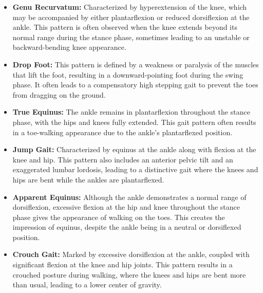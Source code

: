 \documentclass[UKenglish]{uiomasterthesis}
\begin{document}
\begin{itemize}
    \item{\textbf{Genu Recurvatum:} Characterized by hyperextension of the knee, which may be accompanied by either plantarflexion or reduced dorsiflexion at the ankle. This pattern is often observed when the knee extends beyond its normal range during the stance phase, sometimes leading to an unstable or backward-bending knee appearance.}
    
    \item{\textbf{Drop Foot:} This pattern is defined by a weakness or paralysis of the muscles that lift the foot, resulting in a downward-pointing foot during the swing phase. It often leads to a compensatory high stepping gait to prevent the toes from dragging on the ground.}
    
    \item{\textbf{True Equinus:} The ankle remains in plantarflexion throughout the stance phase, with the hips and knees fully extended. This gait pattern often results in a toe-walking appearance due to the ankle's plantarflexed position.}
    
    \item{\textbf{Jump Gait:} Characterized by equinus at the ankle along with flexion at the knee and hip. This pattern also includes an anterior pelvic tilt and an exaggerated lumbar lordosis, leading to a distinctive gait where the knees and hips are bent while the ankles are plantarflexed.}
    
    \item{\textbf{Apparent Equinus:} Although the ankle demonstrates a normal range of dorsiflexion, excessive flexion at the hip and knee throughout the stance phase gives the appearance of walking on the toes. This creates the impression of equinus, despite the ankle being in a neutral or dorsiflexed position.}
    
    \item{\textbf{Crouch Gait:} Marked by excessive dorsiflexion at the ankle, coupled with significant flexion at the knee and hip joints. This pattern results in a crouched posture during walking, where the knees and hips are bent more than usual, leading to a lower center of gravity.}
    
\end{itemize}
\end{document}
